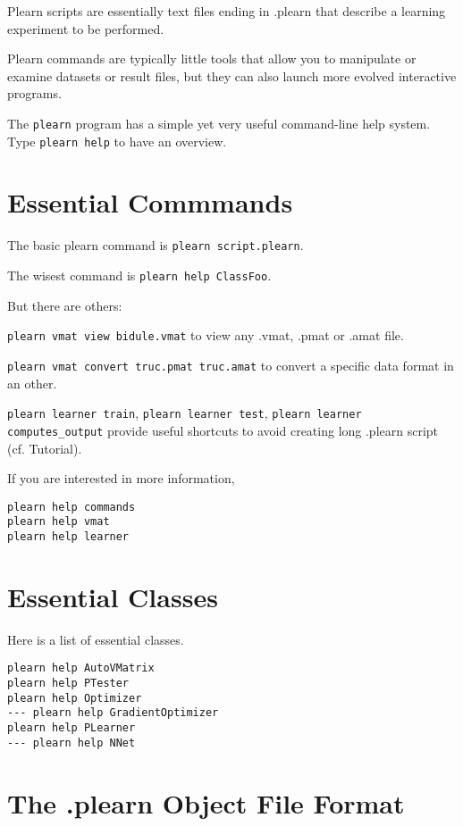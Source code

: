 \documentclass[11pt]{book}
\begin{document}
Plearn scripts are essentially text files ending in .plearn that describe
a learning experiment to be performed.

Plearn commands are typically little tools that allow you to manipulate or examine
datasets or result files, but they can also launch more evolved interactive programs.

The {\tt plearn} program has a simple yet very useful command-line help system.
Type \verb!plearn help! to have an overview.

\section{Essential Commmands}

The basic plearn command is \texttt{plearn script.plearn}.

The wisest command is \texttt{plearn help ClassFoo}.

But there are others:

\texttt{plearn vmat view bidule.vmat} to view any .vmat, .pmat or .amat file.

\texttt{plearn vmat convert truc.pmat truc.amat} to convert a specific data format in an other.

\texttt{plearn learner train}, \texttt{plearn learner test}, \texttt{plearn
  learner computes\_output} provide useful shortcuts to avoid creating long
.plearn script (cf. Tutorial).

If you are interested in more information,

\begin{verbatim}
plearn help commands
plearn help vmat
plearn help learner
\end{verbatim}

\section{Essential Classes}

Here is a list of essential classes.

\begin{verbatim}
plearn help AutoVMatrix
plearn help PTester
plearn help Optimizer
--- plearn help GradientOptimizer
plearn help PLearner
--- plearn help NNet
\end{verbatim}

\section{The .plearn Object File Format}
\end{document}
